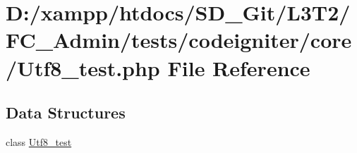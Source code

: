 \hypertarget{_admin_2tests_2codeigniter_2core_2_utf8__test_8php}{}\section{D\+:/xampp/htdocs/\+S\+D\+\_\+\+Git/\+L3\+T2/\+F\+C\+\_\+\+Admin/tests/codeigniter/core/\+Utf8\+\_\+test.php File Reference}
\label{_admin_2tests_2codeigniter_2core_2_utf8__test_8php}
\subsection*{Data Structures}
\begin{DoxyCompactItemize}
\item 
class \hyperlink{class_utf8__test}{Utf8\+\_\+test}
\end{DoxyCompactItemize}
